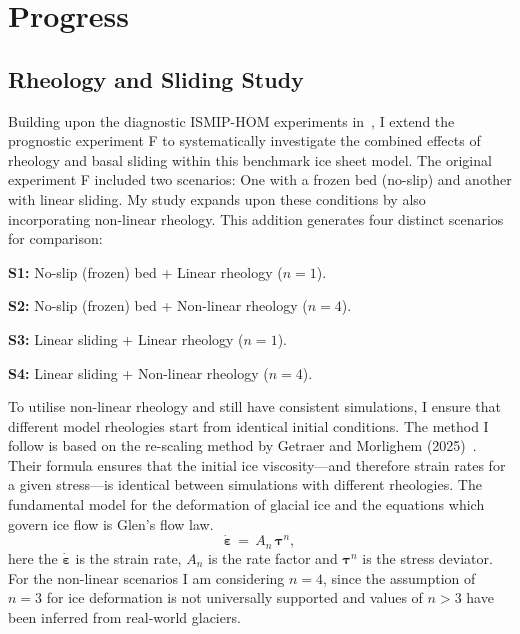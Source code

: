 \chapter{Progress}\label{progress}
\section{Rheology and Sliding Study}\label{study1}
Building upon the diagnostic ISMIP-HOM experiments in~\cite{Pattyn_2008}, I extend the prognostic experiment F to systematically investigate the combined effects of rheology and basal sliding within this benchmark ice sheet model. The original experiment F included two scenarios: One with a frozen bed (no-slip) and another with linear sliding.
My study expands upon these conditions by also incorporating non-linear rheology. This addition generates four distinct scenarios for comparison:
\begin{compactitem}
    \item{\bf{S1}:} No-slip (frozen) bed + Linear rheology ($n=1$).
    \item{\bf{S2}:} No-slip (frozen) bed + Non-linear rheology ($n=4$).
    \item{\bf{S3}:} Linear sliding + Linear rheology ($n=1$).
    \item{\bf{S4}:} Linear sliding + Non-linear rheology ($n=4$).
\end{compactitem}
To utilise non-linear rheology and still have consistent simulations, I ensure that different model rheologies start from identical initial conditions. The method I follow is based on the re-scaling method by Getraer and Morlighem (2025)~\cite{Getraer_2025}. Their formula ensures that the initial ice viscosity—and therefore strain rates for a given stress—is identical between simulations with different rheologies.
The fundamental model for the deformation of glacial ice and the equations which govern ice flow is Glen's flow law. 
\begin{equation}
\mathbf{\dot{\varepsilon}} \,=\, A_{n}\,\mathbf{\tau}^{n},
\end{equation}
here the $\mathbf{\dot{\varepsilon}}$ is the strain rate, $A_n$ is the rate factor and $\mathbf{\tau}^{n}$ is the stress deviator.
For the non-linear scenarios I am considering $n = 4$, since the assumption of $n = 3$ for ice deformation is not universally supported and values of $n > 3$ have been inferred from real‐world glaciers.
